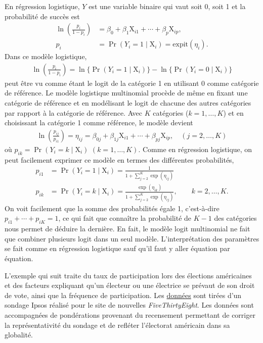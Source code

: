 \documentclass[
  11pt,
  letterpaper,
]{scrbook}
\theoremstyle{definition}
\theoremstyle{remark}
\begin{document}
En régression logistique, \(Y\) est une variable binaire qui vaut soit
0, soit 1 et la probabilité de succès est \begin{align*}
\ln\left(\frac{p_i}{1-p_i}\right) &= \beta_0 + \beta_1 \mathrm{X}_{i1} + \cdots + \beta_p\mathrm{X}_{ip},\\p_i &= \Pr(Y_i=1 \mid \mathrm{X}_i) = \textrm{expit}(\eta_i).
\end{align*} Dans ce modèle logistique,
\begin{align*}\ln\left(\frac{p_i}{1-p_i}\right) = \ln\{\Pr(Y_i=1 \mid \mathrm{X}_i)\} -  \ln\{\Pr(Y_i=0 \mid \mathrm{X}_i)\}
\end{align*} peut être vu comme étant le logit de la catégorie 1 en
utilisant 0 comme catégorie de référence. Le modèle logistique
multinomial procède de même en fixant une catégorie de référence et en
modélisant le logit de chacune des autres catégories par rapport à la
catégorie de référence. Avec \(K\) catégories (\(k = 1, \ldots, K\)) et
en choisissant la catégorie 1 comme référence, le modèle devient
\begin{align*}
 \ln\left(\frac{p_{ij}}{p_{i1}}\right) = \eta_{ij} = \beta_{0j} + \beta_{1j} \mathrm{X}_{i1} + \cdots + \beta_{pj}\mathrm{X}_{ip}, \quad (j=2, \ldots, K)
\end{align*} où \(p_{ik} = \Pr(Y_i=k \mid \mathrm{X}_i)\)
\((k=1, \ldots, K)\). Comme en régression logistique, on peut facilement
exprimer ce modèle en termes des différentes probabilités,
\begin{align*}
 p_{i1} &= \Pr(Y_i=1 \mid \mathrm{X}_i) = \frac{1}{1+ \sum_{j=2}^K\exp(\eta_{ij})}\\
 p_{ik} &= \Pr(Y_i=k \mid \mathrm{X}_i) = \frac{\exp(\eta_{ik})}{1+ \sum_{j=2}^K\exp(\eta_{ij})}, \qquad k=2, \ldots, K.
\end{align*} On voit facilement que la somme des probabilités égale 1,
c'est-à-dire \(p_{i1} + \cdots + p_{iK} = 1\), ce qui fait que connaître
la probabilité de \(K-1\) des catégories nous permet de déduire la
dernière. En fait, le modèle logit multinomial ne fait que combiner
plusieurs logit dans un seul modèle. L'interprétation des paramètres se
fait comme en régression logistique sauf qu'il faut y aller équation par
équation.

L'exemple qui suit traite du taux de participation lors des élections
américaines et des facteurs expliquant qu'un électeur ou une électrice
se prévaut de son droit de vote, ainsi que la fréquence de
participation. Les
\href{https://github.com/fivethirtyeight/data/tree/master/non-voters}{données}
sont tirées d'un sondage Ipsos réalisé pour le site de nouvelles
\emph{FiveThirtyEight}. Les données sont accompagnées de pondérations
provenant du recensement permettant de corriger la représentativité du
sondage et de refléter l'électorat américain dans sa globalité.
\end{document}
